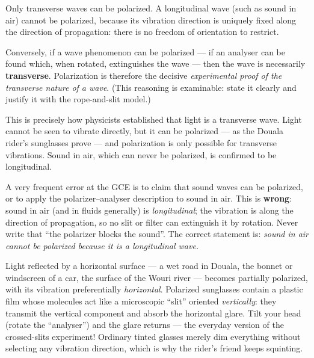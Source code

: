 \documentclass[11pt]{article}
\newcommand{\cle}[1]{{\popxbold\color{popdark}#1}}
\begin{document}
\begin{propriete}
Only \cle{transverse waves} can be polarized. A longitudinal wave (such as sound in air) cannot be polarized, because its vibration direction is uniquely fixed along the direction of propagation: there is no freedom of orientation to restrict.

Conversely, if a wave phenomenon can be polarized --- if an analyser can be found which, when rotated, extinguishes the wave --- then the wave is necessarily \textbf{transverse}. Polarization is therefore the decisive \emph{experimental proof of the transverse nature of a wave}. (This reasoning is examinable: state it clearly and justify it with the rope-and-slit model.)
\end{propriete}

This is precisely how physicists established that light is a transverse wave. Light cannot be seen to vibrate directly, but it can be polarized --- as the Douala rider's sunglasses prove --- and polarization is only possible for transverse vibrations. Sound in air, which can never be polarized, is confirmed to be longitudinal.

\begin{attention}
A very frequent error at the GCE is to claim that sound waves can be polarized, or to apply the polarizer--analyser description to sound in air. This is \textbf{wrong}: sound in air (and in fluids generally) is \emph{longitudinal}; the vibration is along the direction of propagation, so no slit or filter can extinguish it by rotation. Never write that ``the polarizer blocks the sound''. The correct statement is: \emph{sound in air cannot be polarized because it is a longitudinal wave.}
\end{attention}

\begin{savaistu}
Light reflected by a horizontal surface --- a wet road in Douala, the bonnet or windscreen of a car, the surface of the Wouri river --- becomes partially polarized, with its vibration preferentially \emph{horizontal}. Polarized sunglasses contain a plastic film whose molecules act like a microscopic ``slit'' oriented \emph{vertically}: they transmit the vertical component and absorb the horizontal glare. Tilt your head (rotate the ``analyser'') and the glare returns --- the everyday version of the crossed-slits experiment! Ordinary tinted glasses merely dim everything without selecting any vibration direction, which is why the rider's friend keeps squinting.
\end{savaistu}
\end{document}
